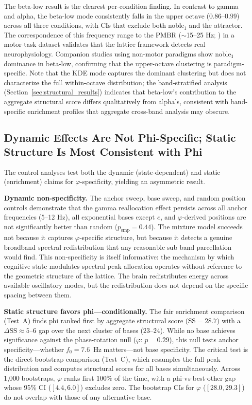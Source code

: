 \documentclass[11pt,a4paper]{article}
\newcommand{\phisym}{\varphi}
\newcommand{\fzero}{f_0}
\begin{document}
The beta-low result is the clearest per-condition finding. In contrast to gamma and alpha, the beta-low mode consistently falls in the upper octave ($0.86$--$0.99$) across all three conditions, with CIs that exclude both noble$_1$ and the attractor. The correspondence of this frequency range to the PMBR ($\sim$15--25 Hz; \parencite{pfurtscheller1999event, jurkiewicz2006pmbr}) in a motor-task dataset validates that the lattice framework detects real neurophysiology. Companion studies using non-motor paradigms show noble$_1$ dominance in beta-low, confirming that the upper-octave clustering is paradigm-specific. Note that the KDE mode captures the dominant clustering but does not characterize the full within-octave distribution; the band-stratified analysis (Section~\ref{sec:structural_results}) indicates that beta-low's contribution to the aggregate structural score differs qualitatively from alpha's, consistent with band-specific enrichment profiles that aggregate cross-band analysis may obscure.

\subsection{Dynamic Effects Are Not Phi-Specific; Static Structure Is Most Consistent with Phi}

The control analyses test both the dynamic (state-dependent) and static (enrichment) claims for $\phisym$-specificity, yielding an asymmetric result.

\textbf{Dynamic non-specificity.} The anchor sweep, base sweep, and random position controls demonstrate that the gamma reallocation effect persists across all anchor frequencies (5--12 Hz), all exponential bases except $e$, and $\phisym$-derived positions are not significantly better than random ($p_{\text{emp}} = 0.44$). The mixture model succeeds not because it captures $\phisym$-specific structure, but because it detects a genuine broadband spectral redistribution that any reasonable sub-band parcellation would find. This non-specificity is itself informative: the mechanism by which cognitive state modulates spectral peak allocation operates without reference to the geometric structure of the lattice. The brain redistributes energy across available oscillatory modes, but the redistribution does not depend on the specific spacing between them.

\textbf{Static structure favors phi---conditionally.} The fair enrichment comparison (Test~A) finds phi ranked first by aggregate structural score ($\text{SS} = 28.7$) with a $\Delta\text{SS} \approx 5$--$6$ gap over the next cluster of bases ($23$--$24$). While no base achieves significance against the phase-rotation null ($\phisym$: $p = 0.29$), this null tests anchor specificity---whether $\fzero = 7.6$~Hz matters---not base specificity. The critical test is the direct bootstrap comparison (Test~C), which resamples the full peak distribution and computes structural scores for all bases simultaneously. Across 1,000 bootstraps, $\phisym$ ranks first 100\% of the time, with a phi-vs-best-other gap whose 95\% CI ($[4.4, 6.0]$) excludes zero. The bootstrap CIs for $\phisym$ ($[28.0, 29.3]$) do not overlap with those of any alternative base.
\end{document}
